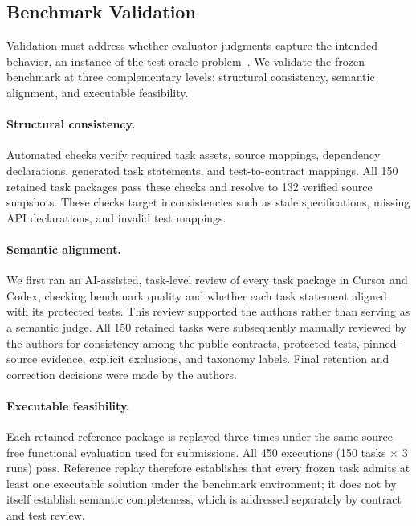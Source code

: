 \documentclass[acmsmall,screen,review,anonymous]{acmart}
\begin{document}
\subsection{Benchmark Validation}
\label{sec:validation}

Validation must address whether evaluator judgments capture the intended
behavior, an instance of the test-oracle problem~\cite{barr2015oracle}.
We validate the frozen benchmark at three complementary levels: structural
consistency, semantic alignment, and executable feasibility.

\paragraph{Structural consistency.}
Automated checks verify required task assets, source mappings, dependency
declarations, generated task statements, and test-to-contract mappings. All 150
retained task packages pass these checks and resolve to 132 verified source
snapshots. These checks target inconsistencies such as stale specifications,
missing API declarations, and invalid test mappings.

\paragraph{Semantic alignment.}
We first ran an AI-assisted, task-level review of every task package in Cursor
and Codex, checking benchmark quality and whether each task statement aligned
with its protected tests. This review supported the authors rather than serving
as a semantic judge. All 150 retained tasks were subsequently
manually reviewed by the authors for consistency among the public contracts,
protected tests, pinned-source evidence, explicit exclusions, and taxonomy
labels. Final retention and correction decisions were made by the authors.

\paragraph{Executable feasibility.}
Each retained reference package is replayed three times under the same
source-free functional evaluation used for submissions. All 450 executions
(150 tasks $\times$ 3 runs) pass. Reference replay therefore establishes that
every frozen task admits at least one executable solution under the benchmark
environment; it does not by itself establish semantic completeness, which is
addressed separately by contract and test review.
\end{document}
